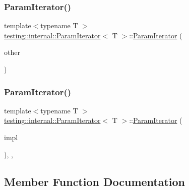 \subsubsection{\texorpdfstring{ParamIterator()}{ParamIterator()}\hspace{0.1cm}{\footnotesize\ttfamily [5/6]}}
{\footnotesize\ttfamily template$<$typename T $>$ \\
\mbox{\hyperlink{classtesting_1_1internal_1_1_param_iterator}{testing\+::internal\+::\+Param\+Iterator}}$<$ T $>$\+::\mbox{\hyperlink{classtesting_1_1internal_1_1_param_iterator}{Param\+Iterator}} (\begin{DoxyParamCaption}\item[{const \mbox{\hyperlink{classtesting_1_1internal_1_1_param_iterator}{Param\+Iterator}}$<$ T $>$ \&}]{other }\end{DoxyParamCaption})\hspace{0.3cm}{\ttfamily [inline]}}

\mbox{\label{classtesting_1_1internal_1_1_param_iterator_acf5ad898e7f50eb82a6c367889aa07c4}} 
\subsubsection{\texorpdfstring{ParamIterator()}{ParamIterator()}\hspace{0.1cm}{\footnotesize\ttfamily [6/6]}}
{\footnotesize\ttfamily template$<$typename T $>$ \\
\mbox{\hyperlink{classtesting_1_1internal_1_1_param_iterator}{testing\+::internal\+::\+Param\+Iterator}}$<$ T $>$\+::\mbox{\hyperlink{classtesting_1_1internal_1_1_param_iterator}{Param\+Iterator}} (\begin{DoxyParamCaption}\item[{\mbox{\hyperlink{classtesting_1_1internal_1_1_param_iterator_interface}{Param\+Iterator\+Interface}}$<$ T $>$ $\ast$}]{impl }\end{DoxyParamCaption})\hspace{0.3cm}{\ttfamily [inline]}, {\ttfamily [explicit]}, {\ttfamily [private]}}



\subsection{Member Function Documentation}
\mbox{\label{classtesting_1_1internal_1_1_param_iterator_aa024380a4cc0cfdcaa114e942c348fce}} 
